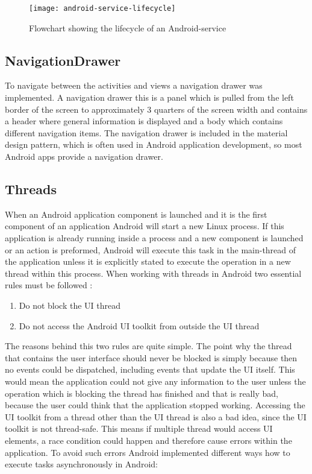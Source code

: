 \begin{figure}[H]
    \centering
    \texttt{[image: android-service-lifecycle]}
    \caption{Flowchart showing the lifecycle of an Android-service}
    \label{fig:servicelifecycle}
\end{figure}

\subsection{NavigationDrawer}
To navigate between the activities and views a navigation drawer was implemented. A navigation drawer this is a panel which is pulled from the left border of the screen to approximately 3 quarters of the screen width and contains a header where general information is displayed and a body which contains different navigation items. The navigation drawer is included in the material design pattern, which is often used in Android application development, so most Android apps provide a navigation drawer.

\subsection{Threads}
When an Android application component is launched and it is the first component of an application Android will start a new Linux process. If this application is already running inside a process and a new component is launched or an action is preformed, Android will execute this task in the main-thread of the application unless it is explicitly stated to execute the operation in a new thread within this process. When working with threads in Android two essential rules must be followed \autocite{AndroidThreads} :

\begin{enumerate}
    \item Do not block the UI thread
    \item Do not access the Android UI toolkit from outside the UI thread
\end{enumerate}

\noindent The reasons behind this two rules are quite simple. The point why the thread that contains the user interface should never be blocked is simply because then no events could be dispatched, including events that update the UI itself. This would mean the application could not give any information to the user unless the operation which is blocking the thread has finished and that is really bad, because the user could think that the application stopped working. Accessing the UI toolkit from a thread other than the UI thread is also a bad idea, since the UI toolkit is not thread-safe. This means if multiple thread would access UI elements, a race condition could happen and therefore cause errors within the application. To avoid such errors Android implemented different ways how to execute tasks asynchronously in Android:

